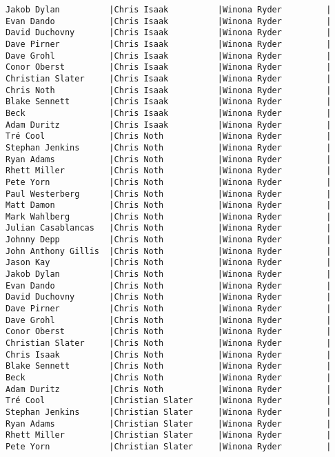 \documentclass{article}
\begin{document}
\begin{verbatim}
Jakob Dylan          |Chris Isaak          |Winona Ryder         |
Evan Dando           |Chris Isaak          |Winona Ryder         |
David Duchovny       |Chris Isaak          |Winona Ryder         |
Dave Pirner          |Chris Isaak          |Winona Ryder         |
Dave Grohl           |Chris Isaak          |Winona Ryder         |
Conor Oberst         |Chris Isaak          |Winona Ryder         |
Christian Slater     |Chris Isaak          |Winona Ryder         |
Chris Noth           |Chris Isaak          |Winona Ryder         |
Blake Sennett        |Chris Isaak          |Winona Ryder         |
Beck                 |Chris Isaak          |Winona Ryder         |
Adam Duritz          |Chris Isaak          |Winona Ryder         |
Tré Cool             |Chris Noth           |Winona Ryder         |
Stephan Jenkins      |Chris Noth           |Winona Ryder         |
Ryan Adams           |Chris Noth           |Winona Ryder         |
Rhett Miller         |Chris Noth           |Winona Ryder         |
Pete Yorn            |Chris Noth           |Winona Ryder         |
Paul Westerberg      |Chris Noth           |Winona Ryder         |
Matt Damon           |Chris Noth           |Winona Ryder         |
Mark Wahlberg        |Chris Noth           |Winona Ryder         |
Julian Casablancas   |Chris Noth           |Winona Ryder         |
Johnny Depp          |Chris Noth           |Winona Ryder         |
John Anthony Gillis  |Chris Noth           |Winona Ryder         |
Jason Kay            |Chris Noth           |Winona Ryder         |
Jakob Dylan          |Chris Noth           |Winona Ryder         |
Evan Dando           |Chris Noth           |Winona Ryder         |
David Duchovny       |Chris Noth           |Winona Ryder         |
Dave Pirner          |Chris Noth           |Winona Ryder         |
Dave Grohl           |Chris Noth           |Winona Ryder         |
Conor Oberst         |Chris Noth           |Winona Ryder         |
Christian Slater     |Chris Noth           |Winona Ryder         |
Chris Isaak          |Chris Noth           |Winona Ryder         |
Blake Sennett        |Chris Noth           |Winona Ryder         |
Beck                 |Chris Noth           |Winona Ryder         |
Adam Duritz          |Chris Noth           |Winona Ryder         |
Tré Cool             |Christian Slater     |Winona Ryder         |
Stephan Jenkins      |Christian Slater     |Winona Ryder         |
Ryan Adams           |Christian Slater     |Winona Ryder         |
Rhett Miller         |Christian Slater     |Winona Ryder         |
Pete Yorn            |Christian Slater     |Winona Ryder         |

\end{verbatim}
\end{document}
